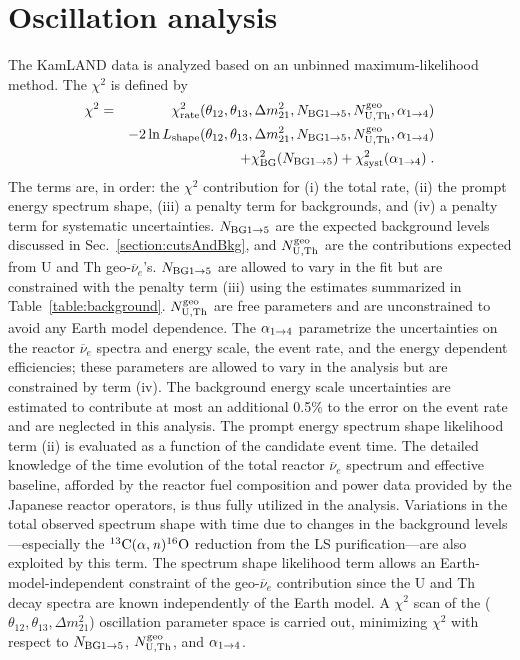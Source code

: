 \documentclass[aps,prc,twocolumn,groupedaddress,showpacs,amsmath,amssymb,floatfix,superscriptaddress]{revtex4}
\begin{document}
\section{Oscillation analysis}
\label{section:Analysis}
The KamLAND data is analyzed based on an unbinned maximum-likelihood method.  The $\chi^{2}$ is defined by 
\begin{eqnarray}
\label{equation:chi2}
\chi^{2} & = & \chi^{2}_{\rm rate}(\theta_{12}, \theta_{13}, \Delta m^{2}_{21}, N_{\rm BG1\rightarrow5}, N^{\rm{geo}}_{{\rm U},{\rm Th}}, \alpha_{\rm 1\rightarrow4}) \nonumber \\
& & - 2 \ln L_{\rm shape} (\theta_{12}, \theta_{13}, \Delta m^{2}_{21}, N_{\rm BG1\rightarrow5}, N^{\rm{geo}}_{{\rm U},{\rm Th}}, \alpha_{\rm 1\rightarrow4}) \nonumber \\
& & + \chi^{2}_{\rm BG}(N_{\rm BG1\rightarrow5}) + \chi^{2}_{\rm syst}(\alpha_{\rm 1\rightarrow4})\;.
\end{eqnarray}
The terms are, in order: the $\chi^{2}$ contribution for (i) the total rate, (ii) the prompt energy spectrum shape, (iii) a penalty term for backgrounds, and (iv) a penalty term for systematic uncertainties. $N_{\rm BG1\rightarrow5}$ are the expected background levels discussed in Sec.~\ref{section:cutsAndBkg}, and $N^{\rm{geo}}_{{\rm U},{\rm Th}}$ are the contributions expected from U and Th geo-$\overline{\nu}_{e}$'s. $N_{\rm BG1\rightarrow5}$ are allowed to vary in the fit but are constrained with the penalty term (iii) using the estimates summarized in Table~\ref{table:background}.  $N^{\rm{geo}}_{{\rm U},{\rm Th}}$ are free parameters and are unconstrained to avoid any Earth model dependence.  The $\alpha_{\rm 1\rightarrow4}$ parametrize the uncertainties on the reactor $\overline{\nu}_{e}$ spectra and energy scale, the event rate, and the energy dependent efficiencies; these parameters are allowed to vary in the analysis but are constrained by term (iv).  The background energy scale uncertainties are estimated to contribute at most an additional 0.5\% to the error on the event rate and are neglected in this analysis.  The prompt energy spectrum shape likelihood term (ii) is evaluated as a function of the candidate event time.  The detailed knowledge of the time evolution of the total reactor $\overline{\nu}_{e}$ spectrum and effective baseline, afforded by the reactor fuel composition and power data provided by the Japanese reactor operators, is thus fully utilized in the analysis.  Variations in the total observed spectrum shape with time due to changes in the background levels---especially the $^{13}{\rm C}(\alpha,{\it n})^{16}{\rm O}$ reduction from the LS purification---are also exploited by this term.  The spectrum shape likelihood term allows an Earth-model-independent constraint of the geo-$\overline{\nu}_{e}$ contribution since the U and Th decay spectra are known independently of the Earth model. A $\chi^{2}$ scan of the ($\theta_{12}, \theta_{13}, \Delta m^{2}_{21}$) oscillation parameter space is carried out, minimizing $\chi^{2}$ with respect to $N_{\rm BG1\rightarrow5}$, $N^{\rm{geo}}_{{\rm U},{\rm Th}}$, and $\alpha_{\rm 1\rightarrow4}$. 
\end{document}
